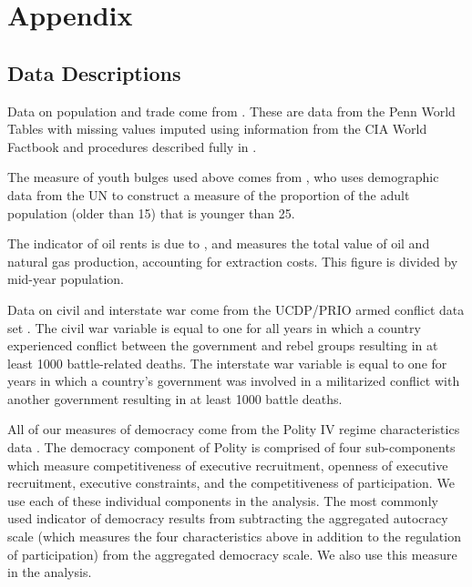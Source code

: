 \documentclass[12pt]{article}
\begin{document}
\newpage
\begin{singlespace}


\end{singlespace}

\appendix
\section{Appendix}

\subsection{Data Descriptions}

Data on population and trade come from \citet{gleditsch2002expanded}. These are data from the Penn World Tables \citep{summers1991penn} with missing values imputed using information from the CIA World Factbook and procedures described fully in \citet{gleditsch2002expanded}. 

The measure of youth bulges used above comes from \citet{Urdal2006}, who uses demographic data from the UN to construct a measure of the proportion of the adult population (older than 15) that is younger than 25.

The indicator of oil rents is due to \citet{Ross2006}, and measures the total value of oil and natural gas production, accounting for extraction costs. This figure is divided by mid-year population. 

Data on civil and interstate war come from the UCDP/PRIO armed conflict data set \citep{ThemnerWallensteen2012}. The civil war variable is equal to one for all years in which a country experienced conflict between the government and rebel groups resulting in at least 1000 battle-related deaths. The interstate war variable is equal to one for years in which a country's government was involved in a militarized conflict with another government resulting in at least 1000 battle deaths.

All of our measures of democracy come from the Polity IV regime characteristics data \citep{MarshallJaggers2009}. The democracy component of Polity is comprised of four sub-components which measure competitiveness of executive recruitment, openness of executive recruitment, executive constraints, and the competitiveness of participation. We use each of these individual components in the analysis. The most commonly used indicator of democracy results from subtracting the aggregated autocracy scale (which measures the four characteristics above in addition to the regulation of participation) from the aggregated democracy scale. We also use this measure in the analysis.  
\end{document}
